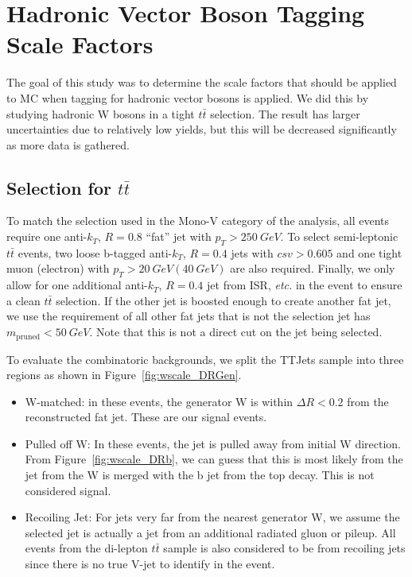 \documentclass{article}
\begin{document}
\section{Hadronic Vector Boson Tagging Scale Factors} \label{sec:wscale}

The goal of this study was to determine the scale factors that should
be applied to MC when tagging for hadronic vector bosons is applied.
We did this by studying hadronic W bosons in a tight $t\bar{t}$ selection.
The result has larger uncertainties due to relatively low yields,
but this will be decreased significantly as more data is gathered.

\subsection{Selection for $t\bar{t}$} \label{sec:wscale_selection}

To match the selection used in the Mono-V category of the analysis,
all events require one anti-$k_T$, $R = 0.8$ ``fat'' jet with $p_T > \SI{250}{GeV}$.
To select semi-leptonic $t\bar{t}$ events, two loose b-tagged anti-$k_T$, $R = 0.4$
jets with $csv > 0.605$ and one tight muon (electron) with
$p_T > \SI{20}{GeV} (\SI{40}{GeV})$ are also required.
Finally, we only allow for one additional anti-$k_T$, $R = 0.4$ jet from ISR, \emph{etc.}
in the event to ensure a clean $t\bar{t}$ selection.
If the other jet is boosted enough to create another fat jet, we use the requirement 
of all other fat jets that is not the selection jet has $m_\text{pruned} < \SI{50}{GeV}$.
Note that this is not a direct cut on the jet being selected.

To evaluate the combinatoric backgrounds, we split the TTJets sample into three regions
as shown in Figure~\ref{fig:wscale_DRGen}.
\begin{itemize}
\item W-matched: in these events, the generator W is within $\Delta R < 0.2$ from the
  reconstructed fat jet. These are our signal events.
\item Pulled off W: In these events, the jet is pulled away from initial W direction.
  From Figure~\ref{fig:wscale_DRb}, we can guess that this is most likely from the jet from
  the W is merged with the b jet from the top decay.
  This is not considered signal.
\item Recoiling Jet: For jets very far from the nearest generator W, we assume the selected
  jet is actually a jet from an additional radiated gluon or pileup.
  All events from the di-lepton $t\bar{t}$ sample is also considered to be from recoiling jets
  since there is no true V-jet to identify in the event.
\end{itemize}
\end{document}
